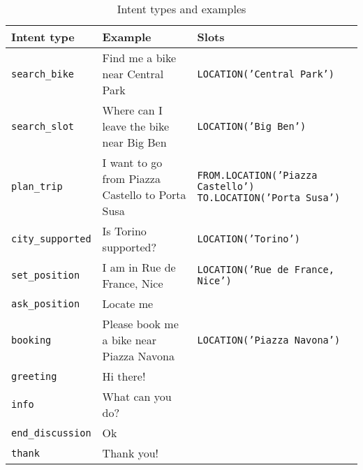 
\begin{table}
  \begin{tabularx}{\textwidth}{lXX}
    \textbf{Intent type} & \textbf{Example} & \textbf{Slots} \\
    \toprule
    \texttt{search\_bike} & Find me a bike near Central Park & \texttt{LOCATION('Central Park')} \\
    \midrule
    \texttt{search\_slot} & Where can I leave the bike near Big Ben &\texttt{LOCATION('Big Ben')} \\
    \midrule
    \texttt{plan\_trip} & I want to go from Piazza Castello to Porta Susa & \texttt{FROM.LOCATION('Piazza Castello') TO.LOCATION('Porta Susa')} \\
    \midrule
    \texttt{city\_supported} & Is Torino supported? & \texttt{LOCATION('Torino')} \\
    \midrule
    \texttt{set\_position} & I am in Rue de France, Nice & \texttt{LOCATION('Rue de France, Nice')} \\
    \midrule
    \texttt{ask\_position} & Locate me & \\
    \midrule
    \texttt{booking} & Please book me a bike near Piazza Navona & \texttt{LOCATION('Piazza Navona')} \\
    \midrule
    \texttt{greeting} & Hi there! & \\
    \midrule
    \texttt{info} & What can you do? & \\
    \midrule
    \texttt{end\_discussion} & Ok & \\
    \midrule
    \texttt{thank} & Thank you! & \\
    \bottomrule
  \end{tabularx}
  \caption{Intent types and examples}\label{tab:nluTypes}
\end{table}